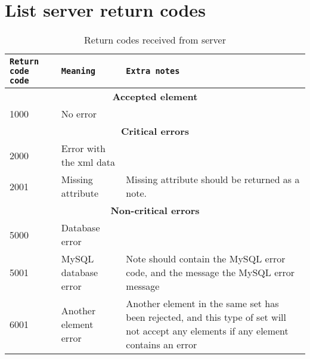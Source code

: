 \newpage
\section{List server return codes}
\label{app:server_return_codes}

\begin{table}[h]
    \centering
    \caption{Return codes received from server}
    \begin{tabular}{|l|l|p{5cm}|}
        \hline
        \texttt{Return code code} & \texttt{Meaning} & \texttt{Extra notes} \\
        \hline
        \hline
        \multicolumn{3}{|c|}{\textbf{Accepted element}} \\
        \hline
        1000 & No error & \\
        \hline
        \hline
        \multicolumn{3}{|c|}{\textbf{Critical errors}} \\
        \hline
        2000 & Error with the \gls{xml} data & \\
        \hline
        2001 & Missing attribute & Missing attribute should be returned as a note. \\
        \hline
        \hline
        \multicolumn{3}{|c|}{\textbf{Non-critical errors}} \\
        \hline
        5000 & Database error & \\
        \hline
        5001 & MySQL database error & Note should contain the MySQL error code, 
        and the message the MySQL error message \\
        \hline
        \hline
        6001 & Another element error & Another element in the same set has been
        rejected, and this type of set will not accept any elements if any
        element contains an error\\
        \hline
    \end{tabular}
    \label{tbl:server_return_codes}
\end{table}
